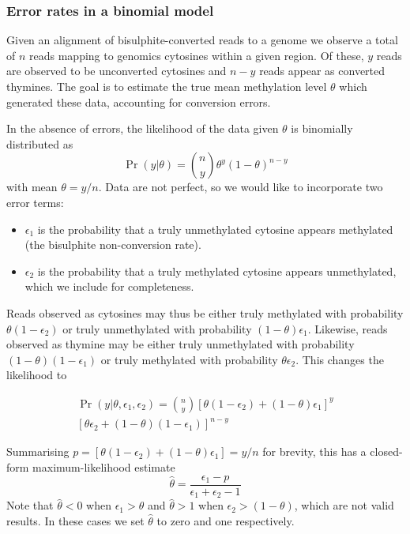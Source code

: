 \documentclass[10pt,letterpaper,draft]{article}
\begin{document}
\subsubsection*{Error rates in a binomial model} \label{sec:binomial-with-errors}

Given an alignment of bisulphite-converted reads to a genome we observe a total of $n$ reads mapping to genomics cytosines within a given region.
Of these, $y$ reads are observed to be unconverted cytosines and $n-y$ reads appear as converted thymines.
The goal is to estimate the true mean methylation level $\theta$ which generated these data, accounting for conversion errors.

In the absence of errors, the likelihood of the data given $\theta$ is binomially distributed as
\begin{equation}
    \label{eqn:classic-binomial}
    \Pr(y | \theta) = {n \choose y} \theta^y(1-\theta)^{n-y}
\end{equation}
with mean $\theta=y/n$.
Data are not perfect, so we would like to incorporate two error terms:
\begin{itemize}
    \item $\epsilon_1$ is the probability that a truly unmethylated cytosine appears methylated (the bisulphite non-conversion rate).
    \item $\epsilon_2$ is the probability that a truly methylated cytosine appears unmethylated, which we include for completeness.
\end{itemize}
Reads observed as cytosines may thus be either truly methylated with probability $\theta(1-\epsilon_2)$ or truly unmethylated with probability $(1-\theta)\epsilon_1$. Likewise, reads observed as thymine may be either truly unmethylated with probability $(1-\theta)(1-\epsilon_1)$ or truly methylated with probability $\theta \epsilon_2$.
This changes the likelihood to

\begin{equation}
\begin{split}
    \label{eqn:binom-with-errors}
    \Pr(y | \theta, \epsilon_1, \epsilon_2) = 
    {n \choose y}
    [\theta(1-\epsilon_2) + (1-\theta)\epsilon_1]^y \\
    [\theta \epsilon_2 + (1-\theta)(1-\epsilon_1)]^{n-y}
\end{split}
\end{equation}

Summarising $p=[\theta(1-\epsilon_2) + (1-\theta)\epsilon_1] = y/n$ for brevity, this has a closed-form maximum-likelihood estimate
\begin{equation}
    \label{eqn:ml-theta}
    \hat{\theta} = \frac{\epsilon_1-p}{\epsilon_1 + \epsilon_2 -1}
\end{equation}
Note that $\hat{\theta}<0$ when $\epsilon_1 > \theta$ and $\hat{\theta}>1$ when $\epsilon_2 > (1-\theta)$, which are not valid results.
In these cases we set $\hat{\theta}$ to zero and one respectively.
\end{document}
